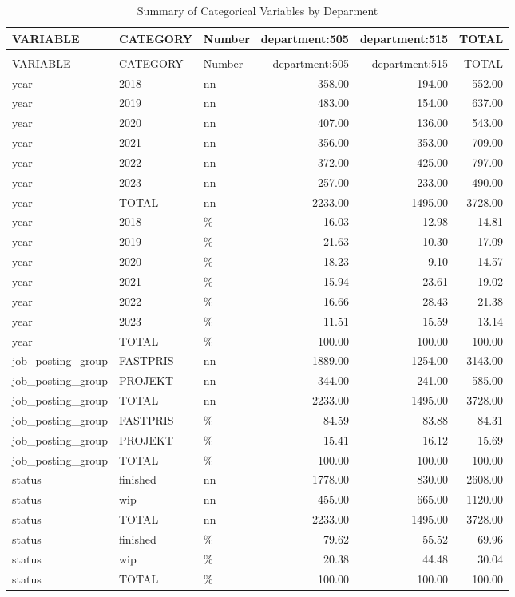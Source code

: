 \begingroup\fontsize{9}{11}\selectfont

\begin{longtable}[t]{lllrrr}
\caption{Summary of Categorical Variables by Deparment}\\
\toprule
VARIABLE & CATEGORY & Number & department:505 & department:515 & TOTAL\\
\midrule
\endfirsthead
\caption[]{Summary of Categorical Variables by Deparment }\\
\toprule
VARIABLE & CATEGORY & Number & department:505 & department:515 & TOTAL\\
\midrule
\endhead

\endfoot
\bottomrule
\endlastfoot
year & 2018 & nn & 358.00 & 194.00 & 552.00\\
year & 2019 & nn & 483.00 & 154.00 & 637.00\\
year & 2020 & nn & 407.00 & 136.00 & 543.00\\
year & 2021 & nn & 356.00 & 353.00 & 709.00\\
year & 2022 & nn & 372.00 & 425.00 & 797.00\\
year & 2023 & nn & 257.00 & 233.00 & 490.00\\
year & TOTAL & nn & 2233.00 & 1495.00 & 3728.00\\
year & 2018 & \% & 16.03 & 12.98 & 14.81\\
year & 2019 & \% & 21.63 & 10.30 & 17.09\\
year & 2020 & \% & 18.23 & 9.10 & 14.57\\
year & 2021 & \% & 15.94 & 23.61 & 19.02\\
year & 2022 & \% & 16.66 & 28.43 & 21.38\\
year & 2023 & \% & 11.51 & 15.59 & 13.14\\
year & TOTAL & \% & 100.00 & 100.00 & 100.00\\
job\_posting\_group & FASTPRIS & nn & 1889.00 & 1254.00 & 3143.00\\
job\_posting\_group & PROJEKT & nn & 344.00 & 241.00 & 585.00\\
job\_posting\_group & TOTAL & nn & 2233.00 & 1495.00 & 3728.00\\
job\_posting\_group & FASTPRIS & \% & 84.59 & 83.88 & 84.31\\
job\_posting\_group & PROJEKT & \% & 15.41 & 16.12 & 15.69\\
job\_posting\_group & TOTAL & \% & 100.00 & 100.00 & 100.00\\
status & finished & nn & 1778.00 & 830.00 & 2608.00\\
status & wip & nn & 455.00 & 665.00 & 1120.00\\
status & TOTAL & nn & 2233.00 & 1495.00 & 3728.00\\
status & finished & \% & 79.62 & 55.52 & 69.96\\
status & wip & \% & 20.38 & 44.48 & 30.04\\
status & TOTAL & \% & 100.00 & 100.00 & 100.00\\*
\end{longtable}
\endgroup{}
